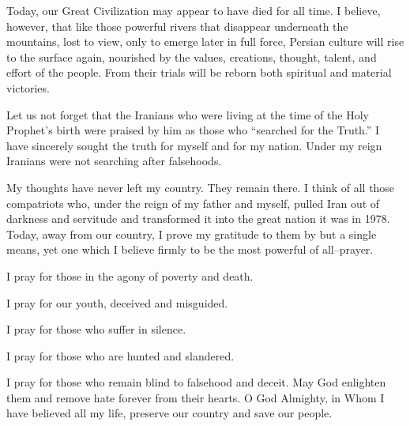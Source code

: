 Today, our Great Civilization may appear to have died for all time. I believe, however, that like those powerful rivers that disappear underneath the mountains, lost to view, only to emerge later in full force, Persian culture will rise to the surface again, nourished by the values, creations, thought, talent, and effort of the people. From their trials will be reborn both spiritual and material victories. 

Let us not forget that the Iranians who were living at the time of the Holy Prophet's birth were praised by him as those who “searched for the Truth.” I have sincerely sought the truth for myself and for my nation. Under my reign Iranians were not searching after falsehoods. 

My thoughts have never left my country. They remain there. I think of all those compatriots who, under the reign of my father and myself, pulled Iran out of darkness and servitude and transformed it into the great nation it was in 1978. Today, away from our country, I prove my gratitude to them by but a single means, yet one which I believe firmly to be the most powerful of all--prayer. 

I pray for those in the agony of poverty and death. 

I pray for our youth, deceived and misguided. 

I pray for those who suffer in silence. 

I pray for those who are hunted and slandered. 

I pray for those who remain blind to falsehood and deceit. May God enlighten them and remove hate forever from their hearts. O God Almighty, in Whom I have believed all my life, preserve our country and save our people. 
